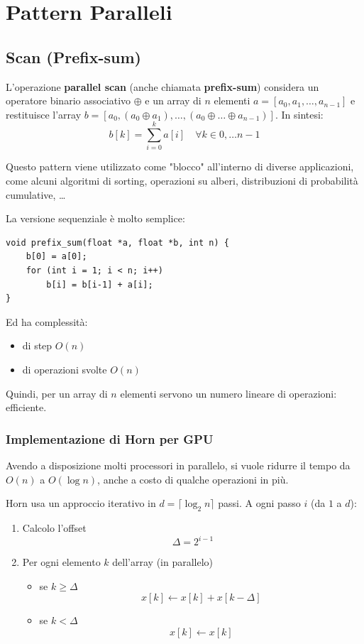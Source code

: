 \section{Pattern Paralleli}

\subsection{Scan (Prefix-sum)}

L'operazione \textbf{parallel scan} (anche chiamata \textbf{prefix-sum}) considera un operatore binario associativo $\oplus$ e un array di $n$ elementi $a = [a_0, a_1, \dots, a_{n-1}]$ e restituisce l'array $b = [a_0, (a_0 \oplus a_1), \dots, (a_0 \oplus \dots \oplus a_{n-1})]$. In sintesi:
$$ b[k] = \sum_{i=0}^{k} a[i] \quad \forall k \in 0, \dots n-1 $$

Questo pattern viene utilizzato come "blocco" all'interno di diverse applicazioni, come alcuni algoritmi di sorting, operazioni su alberi, distribuzioni di probabilità cumulative, \dots

La versione sequenziale è molto semplice:
\begin{verbatim}
void prefix_sum(float *a, float *b, int n) {
    b[0] = a[0];
    for (int i = 1; i < n; i++)
        b[i] = b[i-1] + a[i];
}
\end{verbatim}

Ed ha complessità:
\begin{itemize}
    \item di step $O(n)$
    \item di operazioni svolte $O(n)$
\end{itemize}

Quindi, per un array di $n$ elementi servono un numero lineare di operazioni: efficiente.

\subsubsection{Implementazione di Horn per GPU}

Avendo a disposizione molti processori in parallelo, si vuole ridurre il tempo da $O(n)$ a $O(\log n)$, anche a costo di qualche operazioni in più. 

Horn usa un approccio iterativo in $d = \lceil \log_2 n \rceil$ passi. A ogni passo $i$ (da $1$ a $d$):
\begin{enumerate}
    \item Calcolo l'offset 
    $$ \Delta = 2^{i-1} $$
    \item Per ogni elemento $k$ dell'array (in parallelo)
    \begin{itemize}
        \item se $k \geq \Delta$ 
        $$ x[k] \leftarrow x[k] + x[k - \Delta] $$
        \item se $k < \Delta$
        $$ x[k] \leftarrow x[k] $$
    \end{itemize}
\end{enumerate}

